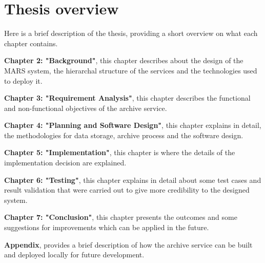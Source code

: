     \newpage
    \section{Thesis overview} 
        Here is a brief description of the thesis, providing a short overview on what each
        chapter contains.
        
        \par
        \textbf{Chapter 2: "Background"}, this chapter describes about the design
        of the MARS system, the hierarchal structure of the services and the technologies used to
        deploy it.

        \par
        \textbf{Chapter 3: "Requirement Analysis"}, this chapter describes the functional and
        non-functional objectives of the archive service.

        \par
        \textbf{Chapter 4: "Planning and Software Design"}, this chapter explains in detail, the 
        methodologies for data storage, archive process and the software design.

        \par
        \textbf{Chapter 5: "Implementation"}, this chapter is where the details of the 
        implementation decision are explained.

        \par
        \textbf{Chapter 6: "Testing"}, this chapter explains in detail about 
        some test cases and result validation that were carried out to give more credibility to the designed system.

        \par
        \textbf{Chapter 7: "Conclusion"}, this chapter presents the outcomes and some 
        suggestions for improvements which can be applied in the future.
        
        \textbf{Appendix}, provides a brief description of how the archive service can be built and deployed locally for future development.


